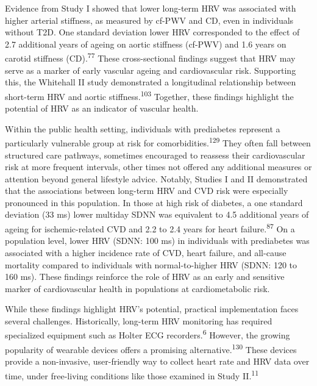 \documentclass[
  letterpaper,
  headsepline=true,
  open=any]{scrbook}
\begin{document}
Evidence from Study I showed that lower long-term HRV was associated
with higher arterial stiffness, as measured by cf-PWV and CD, even in
individuals without T2D. One standard deviation lower HRV corresponded
to the effect of 2.7 additional years of ageing on aortic stiffness
(cf-PWV) and 1.6 years on carotid stiffness (CD).\textsuperscript{77}
These cross-sectional findings suggest that HRV may serve as a marker of
early vascular ageing and cardiovascular risk. Supporting this, the
Whitehall II study demonstrated a longitudinal relationship between
short-term HRV and aortic stiffness.\textsuperscript{103} Together,
these findings highlight the potential of HRV as an indicator of
vascular health.

Within the public health setting, individuals with prediabetes represent
a particularly vulnerable group at risk for
comorbidities.\textsuperscript{129} They often fall between structured
care pathways, sometimes encouraged to reassess their cardiovascular
risk at more frequent intervals, other times not offered any additional
measures or attention beyond general lifestyle advice. Notably, Studies
I and II demonstrated that the associations between long-term HRV and
CVD risk were especially pronounced in this population. In those at high
risk of diabetes, a one standard deviation (33 ms) lower multiday SDNN
was equivalent to 4.5 additional years of ageing for ischemic-related
CVD and 2.2 to 2.4 years for heart failure.\textsuperscript{87} On a
population level, lower HRV (SDNN: 100 ms) in individuals with
prediabetes was associated with a higher incidence rate of CVD, heart
failure, and all-cause mortality compared to individuals with
normal-to-higher HRV (SDNN: 120 to 160 ms). These findings reinforce the
role of HRV as an early and sensitive marker of cardiovascular health in
populations at cardiometabolic risk.

While these findings highlight HRV's potential, practical implementation
faces several challenges. Historically, long-term HRV monitoring has
required specialized equipment such as Holter ECG
recorders.\textsuperscript{6} However, the growing popularity of
wearable devices offers a promising alternative.\textsuperscript{130}
These devices provide a non-invasive, user-friendly way to collect heart
rate and HRV data over time, under free-living conditions like those
examined in Study II.\textsuperscript{11}
\end{document}
